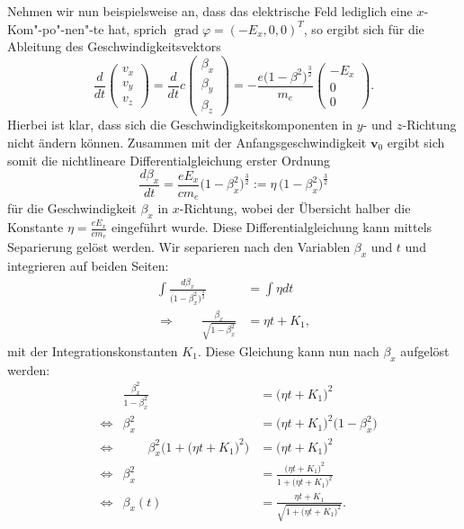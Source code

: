 Nehmen wir nun beispielsweise an,
dass das elektrische Feld lediglich eine \(x\)-Kom"-po"-nen"-te hat,
sprich \( \operatorname{grad} \varphi = (-E_x, 0, 0)^T \),
so ergibt sich für die Ableitung des Geschwindigkeitsvektors
\begin{equation}
    \frac{d}{dt}
    \begin{pmatrix}
        v_x \\
        v_y \\
        v_z
    \end{pmatrix} =
    \frac{d}{dt} c
    \begin{pmatrix}
        \beta_x \\
        \beta_y \\
        \beta_z
    \end{pmatrix}
    =
    - \frac{e \bigl(1-\beta^2\bigr)^\frac{3}{2}}{m_e}
    \begin{pmatrix}
        -E_x \\
        0 \\
        0
    \end{pmatrix}.
    \label{relativ:eqn:bsp-abl-v-vec}
\end{equation}
Hierbei ist klar, dass sich die Geschwindigkeitskomponenten
in \(y\)- und \(z\)-Richtung nicht ändern können.
Zusammen mit der Anfangsgeschwindigkeit \(\bm{v}_0\)
ergibt sich somit die nichtlineare Differentialgleichung erster Ordnung
\begin{equation}
    \frac{d\beta_x}{dt} = \frac{e E_x}{c m_e} \bigl(1-\beta_x^2\bigr)^\frac{3}{2}
    := \eta \, \bigl(1-\beta_x^2\bigr)^\frac{3}{2}
\end{equation}
für die Geschwindigkeit \(\beta_x\) in \(x\)-Richtung,
wobei der Übersicht halber die Konstante
\(\eta=\frac{e E_x}{c m_e}\) eingeführt wurde.
Diese Differentialgleichung kann mittels Separierung gelöst werden.
Wir separieren nach den Variablen \(\beta_x\) und \(t\)
und integrieren auf beiden Seiten:
\begin{align*}
    \int\frac{d\beta_x}{\bigl(1-\beta_x^2\bigr)^\frac{3}{2}}
    &= \int\eta dt \\
    \Rightarrow\qquad\frac{\beta_x}{\sqrt{1-\beta_x^2}}
    &= \eta t + K_1,
\end{align*}
mit der Integrationskonstanten \(K_1\).
Diese Gleichung kann nun nach \(\beta_x\) aufgelöst werden:
\begin{equation*}
\begin{aligned}
    &&
    \frac{\beta_x^2}{1-\beta_x^2}
    &= \bigl(\eta t + K_1\bigr)^2
\\
&\Leftrightarrow&
\beta_x^2 &= \bigl(\eta t + K_1\bigr)^2
\bigl(1-\beta_x^2\bigr)
\\
&\Leftrightarrow&\qquad
\beta_x^2 \bigl(1 + \bigl(\eta t + K_1\bigr)^2\bigr)
&= \bigl(\eta t + K_1\bigr)^2
\\
    &\Leftrightarrow&
    \beta_x^2 &= \frac{\bigl(\eta t + K_1\bigr)^2}
    {1 + \bigl(\eta t + K_1\bigr)^2}
\\
    &\Leftrightarrow&
    \beta_x(t) &= \frac{\eta t + K_1}
    {\sqrt{1+\bigl(\eta t+K_1\bigr)^2}}.
\end{aligned}
\end{equation*}

